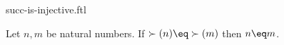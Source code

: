 \documentclass{stex}
\begin{document}
\begin{smodule}{succ-is-injective.ftl}


\begin{axiom}[forthel,id=SuccInInjectAx]
  Let $n, m$ be natural numbers.
  If $\succ(n) \eq \succ(m)$ then $n \eq m$.
\end{axiom}

\end{smodule}
\end{document}
